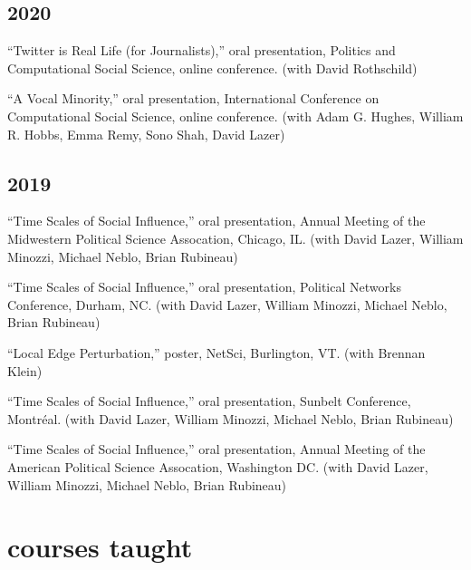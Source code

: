 \documentclass[11pt, letter]{article}
\begin{document}
\subsection{2020}

\begin{hangparas}{.25in}{1}
``Twitter is Real Life (for Journalists),'' oral presentation, Politics and Computational Social Science, online conference. (with David Rothschild)\vspace{2mm}

``A Vocal Minority,'' oral presentation, International Conference on Computational Social Science, online conference. (with Adam G. Hughes, William R. Hobbs, Emma Remy, Sono Shah, David Lazer)

\end{hangparas}
\subsection{2019}

\begin{hangparas}{.25in}{1}
``Time Scales of Social Influence,'' oral presentation, Annual Meeting of the Midwestern Political Science Assocation, Chicago, IL. (with David Lazer, William Minozzi, Michael Neblo, Brian Rubineau)\vspace{2mm}

``Time Scales of Social Influence,'' oral presentation, Political Networks Conference, Durham, NC. (with David Lazer, William Minozzi, Michael Neblo, Brian Rubineau)\vspace{2mm}

``Local Edge Perturbation,'' poster, NetSci, Burlington, VT. (with Brennan Klein)\vspace{2mm}

``Time Scales of Social Influence,'' oral presentation, Sunbelt Conference, Montréal. (with David Lazer, William Minozzi, Michael Neblo, Brian Rubineau)\vspace{2mm}

``Time Scales of Social Influence,'' oral presentation, Annual Meeting of the American Political Science Assocation, Washington DC. (with David Lazer, William Minozzi, Michael Neblo, Brian Rubineau)\vspace{2mm}

\end{hangparas}

\vspace{2mm}
\section{courses taught}
\end{document}
